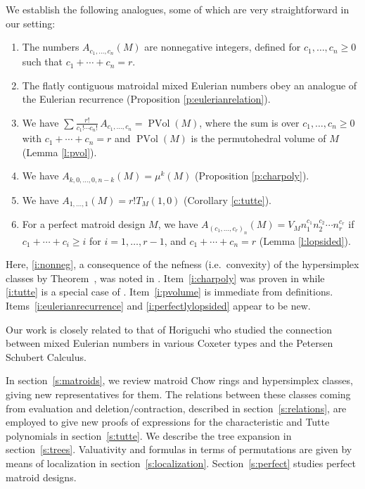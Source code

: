 \documentclass[ALCO,published]{cedram}
\numberwithin{equation}{section}
\numberwithin{figure}{section}
\begin{document}
We establish the following analogues, some of which are very straightforward in our setting:
\begin{enumerate}
\item \label{i:nonneg} The numbers $A_{c_1,\dots,c_n}(M)$ are nonnegative integers, defined
for $c_1,\dots,c_n\geq 0$ such that $c_1+\cdots+c_n=r$.

\item \label{i:eulerianrecurrence} The flatly contiguous matroidal mixed Eulerian numbers obey an analogue of the Eulerian recurrence (Proposition \ref{p:eulerianrelation}).

\item \label{i:pvolume} We have $\sum 
\frac{r!}{c_1!\cdots c_n!}\,A_{c_1,\dots,c_n} = \operatorname{PVol}(M)$,
where the sum is over $c_1,\dots,c_n\geq 0$ with $c_1+\cdots + c_n = r$
and $\operatorname{PVol}(M)$ is the permutohedral volume of $M$ (Lemma \ref{l:pvol}).

\item \label{i:charpoly} We have $A_{k,0,\dots,0,n-k}(M) = \mu^k(M)$ (Proposition \ref{p:charpoly}).

\item \label{i:tutte} We have $A_{1,\dots,1}(M)=r!T_M(1,0)$ (Corollary \ref{c:tutte}).

\item \label{i:perfectlylopsided} For a perfect matroid design $M$, we have $A_{(c_1,\dots,c_r)_n}(M) = V_Mn_1^{c_1} n_2^{c_2} \cdots n_r^{c_r}$
if $c_1+\cdots + c_i \geq i$ for $i=1,\dots,r-1$,
and $c_1+\cdots + c_n = r$ (Lemma \ref{l:lopsided}).
\end{enumerate}

Here, \eqref{i:nonneg}, a consequence of the nefness (i.e.~convexity) of the hypersimplex classes by Theorem~\cite[Theorem~8.9]{AHK}, was noted in \cite{BST}. Item~\eqref{i:charpoly} was proven in \cite{HuhKatz} while \eqref{i:tutte} is a special case of \cite[Corollary~1.6]{BST}. Item~\eqref{i:pvolume} is immediate from definitions. Items~\eqref{i:eulerianrecurrence} and \eqref{i:perfectlylopsided} appear to be new.


Our work is closely related to that of Horiguchi \cite{Horiguchi} who studied the connection between mixed Eulerian numbers in various Coxeter types and the Petersen Schubert Calculus.



In section~\ref{s:matroids}, we review matroid Chow rings and hypersimplex classes, giving new representatives for them. The relations between these classes coming from evaluation and deletion/contraction, described in section~\ref{s:relations}, are employed to give new proofs of expressions for the characteristic and Tutte polynomials in section~\ref{s:tutte}. We describe the tree expansion in section~\ref{s:trees}. Valuativity and formulas in terms of permutations are given by means of localization in section~\ref{s:localization}. Section~\ref{s:perfect} studies perfect matroid designs.
\end{document}
